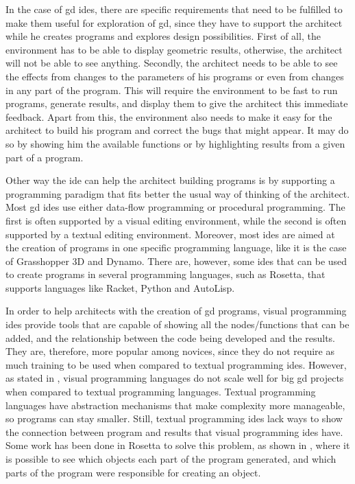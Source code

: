 In the case of \gls{gd} \glspl{ide}, there are specific requirements that need to be fulfilled to make them useful for exploration of \gls{gd}, since they have to support the architect while he creates programs and explores design possibilities.
First of all, the environment has to be able to display geometric results, otherwise, the architect will not be able to see anything.
Secondly, the architect needs to be able to see the effects from changes to the parameters of his programs or even from changes in any part of the program.
This will require the environment to be fast to run programs, generate results, and display them to give the architect this immediate feedback.
Apart from this, the environment also needs to make it easy for the architect to build his program and correct the bugs that might appear.
It may do so by showing him the available functions or by highlighting results from a given part of a program.

Other way the \gls{ide} can help the architect building programs is by supporting a programming paradigm that fits better the usual way of thinking of the architect.
Most \gls{gd} \glspl{ide} use either data-flow programming or procedural programming.
The first is often supported by a visual editing environment, while the second is often supported by a textual editing environment.
Moreover, most \glspl{ide} are aimed at the creation of programs in one specific programming language, like it is the case of Grasshopper 3D and Dynamo.
There are, however, some \glspl{ide} that can be used to create programs in several programming languages, such as Rosetta, that supports languages like Racket, Python and AutoLisp.

In order to help architects with the creation of \gls{gd} programs, visual programming \glspl{ide} provide tools that are capable of showing all the nodes/functions that can be added, and the relationship between the code being developed and the results.
They are, therefore, more popular among novices, since they do not require as much training to be used when compared to textual programming \glspl{ide}.
However, as stated in \cite{leitao2012programming}, visual programming languages do not scale well for big \gls{gd} projects when compared to textual programming languages.
Textual programming languages have abstraction mechanisms that make complexity more manageable, so programs can stay smaller.
Still, textual programming \glspl{ide} lack ways to show the connection between program and results that visual programming \glspl{ide} have.
Some work has been done in Rosetta to solve this problem, as shown in \cite{Leitao2014illustrated}, where it is possible to see which objects each part of the program generated, and which parts of the program were responsible for creating an object.

